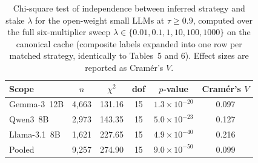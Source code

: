 \documentclass[a4paper,fleqn]{cas-sc}
\begin{document}
\begin{table}[pos=H]
\centering
\caption{Chi-square test of independence between inferred strategy and stake $\lambda$ for the open-weight small LLMs at $\tau \geq 0.9$, computed over the full six-multiplier sweep $\lambda \in \{0.01, 0.1, 1, 10, 100, 1000\}$ on the canonical cache (composite labels expanded into one row per matched strategy, identically to Tables~5 and 6). Effect sizes are reported as Cram\'er's $V$.}
\label{tab:small_chi2}
\footnotesize
\begin{tabular}{lccccc}
\toprule
\textbf{Scope} & $n$ & $\chi^2$ & dof & $p$-value & Cram\'er's $V$ \\
\midrule
Gemma-3~12B  & 4{,}663 & 131.16 & 15 & $1.3 \times 10^{-20}$ & 0.097 \\
Qwen3~8B     & 2{,}973 & 143.35 & 15 & $5.0 \times 10^{-23}$ & 0.127 \\
Llama-3.1~8B & 1{,}621 & 227.65 & 15 & $4.9 \times 10^{-40}$ & 0.216 \\
\midrule
Pooled       & 9{,}257 & 274.90 & 15 & $9.0 \times 10^{-50}$ & 0.099 \\
\bottomrule
\end{tabular}
\end{table}


\FloatBarrier



\end{document}
